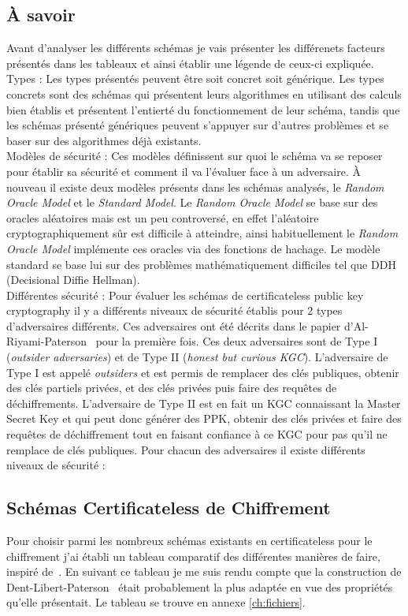 \subsection{À savoir}
Avant d'analyser les différents schémas je vais présenter les différenets facteurs présentés dans les tableaux et ainsi établir une légende de ceux-ci expliquée.\\
Types : Les types présentés peuvent être soit concret soit générique. Les types concrets sont des schémas qui présentent leurs algorithmes en utilisant des calculs bien établis et présentent l'entierté du fonctionnement de leur schéma, tandis que les schémas présenté génériques peuvent s'appuyer sur d'autres problèmes et se baser sur des algorithmes déjà existants.\\
Modèles de sécurité : Ces modèles définissent sur quoi le schéma va se reposer pour établir sa sécurité et comment il va l'évaluer face à un adversaire. À nouveau il existe deux modèles présents dans les schémas analysés, le \textit{Random Oracle Model} et le \textit{Standard Model}. Le \textit{Random Oracle Model} se base sur des oracles aléatoires mais est un peu controversé, en effet l'aléatoire cryptographiquement sûr est difficile à atteindre, ainsi habituellement le \textit{Random Oracle Model} implémente ces oracles via des fonctions de hachage. Le modèle standard se base lui sur des problèmes mathématiquement difficiles tel que DDH (Decisional Diffie Hellman). \\
Différentes sécurité : Pour évaluer les schémas de certificateless public key cryptography il y a différents niveaux de sécurité établis pour 2 types d'adversaires différents. Ces adversaires ont été décrits dans le papier d'Al-Riyami-Paterson~\cite{DBLP:conf/asiacrypt/Al-RiyamiP03} pour la première fois. Ces deux adversaires sont de Type I (\textit{outsider adversaries}) et de Type II (\textit{honest but curious KGC}). L'adversaire de Type I est appelé \textit{outsiders} et est permis de remplacer des clés publiques, obtenir des clés partiels privées, et des clés privées puis faire des requêtes de déchiffrements. L'adversaire de Type II est en fait un KGC connaissant la Master Secret Key et qui peut donc générer des PPK, obtenir des clés privées et faire des requêtes de déchiffrement tout en faisant confiance à ce KGC pour pas qu'il ne remplace de clés publiques. Pour chacun des adversaires il existe différents niveaux de sécurité : \\
\subsection{Schémas Certificateless de Chiffrement}
Pour choisir parmi les nombreux schémas existants en certificateless pour le chiffrement j'ai établi un tableau comparatif des différentes manières de faire, inspiré de~\cite{bookIntroCertificateless}. En suivant ce tableau je me suis rendu compte que la construction de Dent-Libert-Paterson~\cite{DBLP:conf/pkc/DentLP08} était probablement la plus adaptée en vue des propriétés qu'elle présentait. Le tableau se trouve en annexe \ref{ch:fichiers}.

